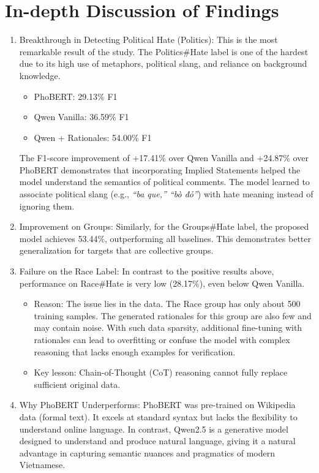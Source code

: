\documentclass[11pt]{article}
\begin{document}
\section{In-depth Discussion of Findings}
\begin{enumerate}[leftmargin=*]
\item Breakthrough in Detecting Political Hate (Politics):
This is the most remarkable result of the study. The Politics\#Hate label is one of the
hardest due to its high use of metaphors, political slang, and reliance on background
knowledge.
\begin{itemize}[leftmargin=*]
\item PhoBERT: 29.13\% F1
\item Qwen Vanilla: 36.59\% F1
\item Qwen + Rationales: 54.00\% F1
\end{itemize}
The F1-score improvement of +17.41\% over Qwen Vanilla and +24.87\% over PhoBERT
demonstrates that incorporating Implied Statements helped the model understand the
semantics of political comments. The model learned to associate political slang (e.g., \foreignlanguage{vietnamese}{\textit{``ba que,'' ``bò đỏ''}}) with hate meaning instead of ignoring them.

\item Improvement on Groups:
Similarly, for the Groups\#Hate label, the proposed model achieves 53.44\%, outperforming
all baselines. This demonstrates better generalization for targets that are collective groups.

\item Failure on the Race Label:
In contrast to the positive results above, performance on Race\#Hate is very low (28.17\%),
even below Qwen Vanilla.
\begin{itemize}[leftmargin=*]
\item Reason: The issue lies in the data. The Race group has only about 500 training samples.
The generated rationales for this group are also few and may contain noise. With such
data sparsity, additional fine-tuning with rationales can lead to overfitting or confuse
the model with complex reasoning that lacks enough examples for verification.
\item Key lesson: Chain-of-Thought (CoT) reasoning cannot fully replace sufficient original
data.
\end{itemize}

\item Why PhoBERT Underperforms:
PhoBERT was pre-trained on Wikipedia data (formal text). It excels at standard syntax but
lacks the flexibility to understand online language. In contrast, Qwen2.5 is a generative
model designed to understand and produce natural language, giving it a natural advantage in
capturing semantic nuances and pragmatics of modern Vietnamese.
\end{enumerate}
\end{document}
